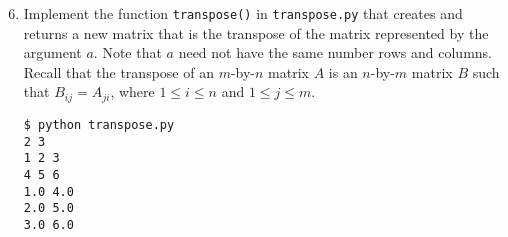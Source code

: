 \documentclass[8pt,a4paper,compress]{beamer}
\begin{document}
\begin{frame}[fragile]
\begin{enumerate}\setcounter{enumi}{5}
\item Implement the function \lstinline{transpose()} in \lstinline{transpose.py} that creates and returns a new matrix that is the transpose 
of the matrix represented by the argument $a$. Note that $a$ need not have the same number rows and columns. Recall that the transpose of an $m$-by-$n$ matrix $A$ is an
 $n$-by-$m$ matrix $B$ such that $B_{ij}=A_{ji}$, where $1 \leq i \leq n$ and $1 \leq j \leq m$.

\begin{lstlisting}[language={}]
$ python transpose.py 
2 3 
1 2 3
4 5 6
1.0 4.0
2.0 5.0
3.0 6.0
\end{lstlisting}
\end{enumerate}
\end{frame}
\end{document}
